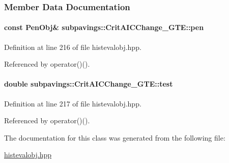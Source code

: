 \subsubsection{\-Member \-Data \-Documentation}
\hypertarget{classsubpavings_1_1CritAICChange__GTE_af7f6dc1d12c5c05c15cde02ea298dc32}{
\paragraph[{pen}]{\setlength{\rightskip}{0pt plus 5cm}const {\bf \-Pen\-Obj}\& {\bf subpavings\-::\-Crit\-A\-I\-C\-Change\-\_\-\-G\-T\-E\-::pen}}}\label{classsubpavings_1_1CritAICChange__GTE_af7f6dc1d12c5c05c15cde02ea298dc32}


\-Definition at line 216 of file histevalobj.\-hpp.



\-Referenced by operator()().

\hypertarget{classsubpavings_1_1CritAICChange__GTE_a117b0b39678df05205f5737ab6e42b92}{
\paragraph[{test}]{\setlength{\rightskip}{0pt plus 5cm}double {\bf subpavings\-::\-Crit\-A\-I\-C\-Change\-\_\-\-G\-T\-E\-::test}}}\label{classsubpavings_1_1CritAICChange__GTE_a117b0b39678df05205f5737ab6e42b92}


\-Definition at line 217 of file histevalobj.\-hpp.



\-Referenced by operator()().



\-The documentation for this class was generated from the following file\-:\begin{DoxyCompactItemize}
\item 
\hyperlink{histevalobj_8hpp}{histevalobj.\-hpp}\end{DoxyCompactItemize}
